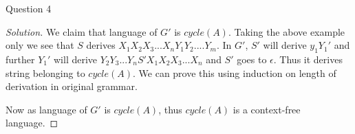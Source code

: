 \begin{solution}{Question 4}
\begin{proof}[Solution]
    We claim that language of $G'$ is $cycle(A)$. Taking the above example only we see that $S$ derives $X_1X_2X_3...X_nY_1Y_2....Y_m$. In $G'$, $S'$ will derive $y_1Y_1'$ and further $Y_1'$ will derive $Y_2Y_3...Y_nS'X_1X_2X_3...X_n$ and $S'$ goes to $\epsilon$. Thus it derives string belonging to $cycle(A)$. We can prove this using induction on length of derivation in original grammar.
    
    Now as language of $G'$ is $cycle(A)$, thus $cycle(A)$ is a context-free language. 
    \end{proof}
\end{solution}
